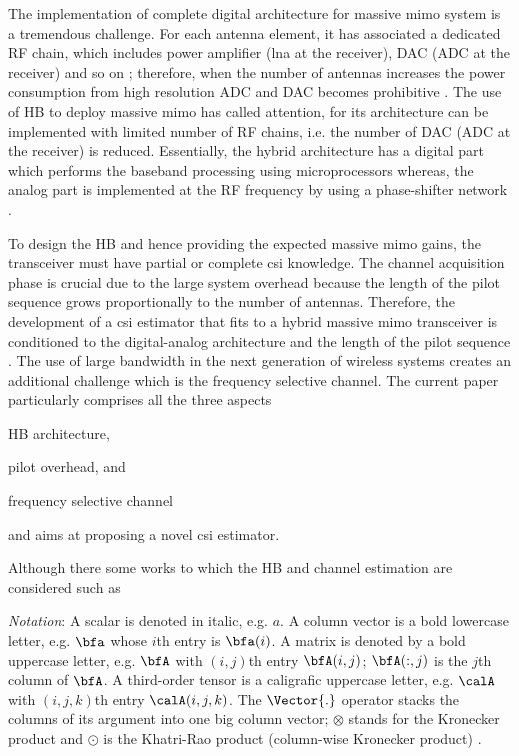 \documentclass[conference]{IEEEtran}
\begin{document}
The implementation of complete digital architecture for massive \gls{mimo}
system is a tremendous challenge. For each antenna element, it has associated a
dedicated \gls{RF} chain, which includes power amplifier (\gls{lna} at the
receiver), \gls{DAC} (\gls{ADC} at the receiver) and so on
\cite{Venkateswaran:2008,Alkhateeb:2014}; therefore, when the number of antennas
increases the power consumption from high resolution \gls{ADC} and \gls{DAC}
becomes prohibitive \cite{Alkhateeb:2014,Alkhateeb:2016a}. The use of \gls{HB}
to deploy massive \gls{mimo} has called attention, for its architecture can be
implemented with limited number of \gls{RF} chains, i.e. the number of \gls{DAC}
(\gls{ADC} at the receiver) is reduced. Essentially, the hybrid architecture has
a digital part which performs the baseband processing using microprocessors
whereas, the analog part is implemented at the \gls{RF} frequency by using a
phase-shifter network \cite{Heath:2016,Alkhateeb:2014,Alkhateeb:2016a}.

To design the \gls{HB} and hence providing the expected massive \gls{mimo} gains, the transceiver must have partial or complete \gls{csi}
knowledge. The channel acquisition phase is crucial due to
the large system overhead because the length of the pilot sequence grows proportionally
to the number of antennas. Therefore, the development of a
\gls{csi} estimator that fits to a hybrid massive \gls{mimo} transceiver is
conditioned to the digital-analog architecture and the length of the pilot sequence
\cite{Alkhateeb:2014,Alkhateeb:2016a}. The use of large bandwidth in the next
generation of wireless systems creates an additional challenge which  is the
frequency selective channel. The current paper particularly comprises all the three aspects
\begin{inparaenum}[(i)]
\item \gls{HB} architecture,
\item pilot overhead, and
\item frequency selective channel
\end{inparaenum}
and aims at proposing a novel \gls{csi} estimator.

Although there some works to
 which the \gls{HB} and channel estimation are considered such as 



\textit{Notation}: A scalar is denoted in italic, e.g. $a$. A column vector is a
bold lowercase letter, e.g. $\bfa$ whose $i$th entry is $\bfa(i)$. A matrix is
denoted by a bold uppercase letter, e.g. $\bfA$ with $(i,j)$th entry
$\bfA(i,j)$; $\bfA(:,j)$ is the $j$th column of $\bfA$. A third-order tensor is
a caligrafic uppercase letter, e.g. $\calA$ with $(i,j,k)$th entry
$\calA(i,j,k)$. The $\Vector{.}$ operator stacks the columns of its argument
into one big column  vector; $\otimes$ stands for the Kronecker product and
$\odot$ is the Khatri-Rao product (column-wise Kronecker product) \cite{Sidiropoulos:2000,Sidiropoulos:2012}. 
\end{document}
